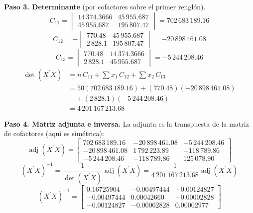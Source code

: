 \documentclass[12pt,letterpaper]{article}
\begin{document}
\textbf{Paso 3. Determinante} (por cofactores sobre el primer renglón).
$$ C_{11} = \begin{vmatrix} 14\,374.3666 & 45\,955.687 \\ 45\,955.687 & 195\,807.47 \end{vmatrix} = 702\,683\,189.16 $$
$$ C_{12} = -\begin{vmatrix} 770.48 & 45\,955.687 \\ 2\,828.1 & 195\,807.47 \end{vmatrix} = -20\,898\,461.08 $$
$$ C_{13} = \begin{vmatrix} 770.48 & 14\,374.3666 \\ 2\,828.1 & 45\,955.687 \end{vmatrix} = -5\,244\,208.46 $$
$$ \begin{aligned} \det(X^{\prime}X) &= n\,C_{11} + \textstyle\sum x_1\,C_{12} + \sum x_2\,C_{13} \\ &= 50(702\,683\,189.16) + (770.48)(-20\,898\,461.08) \\ &\quad + (2\,828.1)(-5\,244\,208.46) \\ &= 4\,201\,167\,213.68 \end{aligned} $$

\textbf{Paso 4. Matriz adjunta e inversa.} La adjunta es la transpuesta de la matriz de cofactores (aquí es simétrica):
$$ \operatorname{adj}(X^{\prime}X) = \begin{bmatrix} 702\,683\,189.16 & -20\,898\,461.08 & -5\,244\,208.46 \\ -20\,898\,461.08 & 1\,792\,223.89 & -118\,789.86 \\ -5\,244\,208.46 & -118\,789.86 & 125\,078.90 \end{bmatrix} $$
$$ (X^{\prime}X)^{-1} = \frac{1}{\det(X^{\prime}X)}\operatorname{adj}(X^{\prime}X) = \frac{1}{4\,201\,167\,213.68}\operatorname{adj}(X^{\prime}X) $$
$$ (X^{\prime}X)^{-1} = \begin{bmatrix} 0.16725904 & -0.00497444 & -0.00124827 \\ -0.00497444 & 0.00042660 & -0.00002828 \\ -0.00124827 & -0.00002828 & 0.00002977 \end{bmatrix} $$
\end{document}
